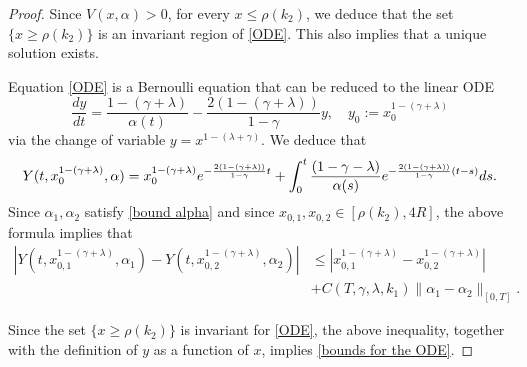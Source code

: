 \documentclass[11pt]{article}
\numberwithin{equation}{section}
\theoremstyle{plain}
\newcommand{\der}{\textup{d}}
\begin{document}
\begin{proof} 
Since $V(x, \alpha)>0$, for every $x \leq \rho(k_2)$, we deduce that the set $\{ x \geq \rho(k_2)\} $ is an invariant region of \eqref{ODE}. This also implies that a unique solution exists. 



Equation \eqref{ODE} is a Bernoulli equation that can be reduced to the linear ODE
\[
\frac{ dy }{ dt} =\frac{ 1-(\gamma+\lambda) }{\alpha(t)} - \frac{2(1-(\gamma+\lambda))}{1-\gamma } y , \quad y_0:= x_0^{1-(\gamma+\lambda)}
\] 
via the change of variable $y=x^{1-(\lambda + \gamma)}$. 
We deduce that 
\[
Y(t,x_0^{1 -(\gamma+\lambda) }, \alpha)= x_0^{1 -(\gamma+\lambda) } e^{- \frac{2(1-(\gamma+\lambda))}{1-\gamma} t } + \int_0^t \frac{(1-\gamma-\lambda)}{\alpha(s) } e^{- \frac{2(1-(\gamma+\lambda))}{1-\gamma} (t-s) } \der s.
\] 
Since $\alpha_1, \alpha_2 $ satisfy \eqref{bound alpha} and since $x_{0,1}, x_{0,2} \in [\rho(k_2), 4R]$, the above formula implies that
\begin{align*}
\left|Y(t,x_{0,1}^{1 -(\gamma+\lambda) }, \alpha_1)-Y(t,x_{0,2}^{1 -(\gamma+\lambda) }, \alpha_2)\right| &\leq \left| x_{0,1}^{1 -(\gamma+\lambda) } - x_{0,2}^{1 -(\gamma+\lambda) }\right| \\
&+ C(T,\gamma,\lambda, k_1) \| \alpha_1 -\alpha_2 \|_{[0, T]}. 
\end{align*}

Since the set $ \{x \geq \rho(k_2)\} $ is invariant for \eqref{ODE}, the above inequality, together with the definition of $y$ as a function of $x$, implies \eqref{bounds for the ODE}.
\end{proof} 
\end{document}
